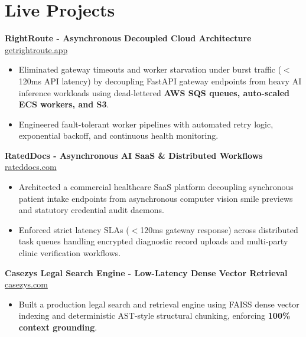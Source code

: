 \documentclass[9.5pt,a4paper]{article}
\begin{document}
\section*{Live Projects}
\noindent
\textbf{RightRoute - Asynchronous Decoupled Cloud Architecture} \hfill \href{https://getrightroute.app}{getrightroute.app}
\begin{itemize}
    \item Eliminated gateway timeouts and worker starvation under burst traffic ($<$120ms API latency) by decoupling FastAPI gateway endpoints from heavy AI inference workloads using dead-lettered \textbf{AWS SQS queues, auto-scaled ECS workers, and S3}.
    \item Engineered fault-tolerant worker pipelines with automated retry logic, exponential backoff, and continuous health monitoring.
\end{itemize}
\vspace{0.2pt}
\noindent
\textbf{RatedDocs - Asynchronous AI SaaS \& Distributed Workflows} \hfill \href{https://rateddocs.com}{rateddocs.com}
\begin{itemize}
    \item Architected a commercial healthcare SaaS platform decoupling synchronous patient intake endpoints from asynchronous computer vision smile previews and statutory credential audit daemons.
    \item Enforced strict latency SLAs ($<$120ms gateway response) across distributed task queues handling encrypted diagnostic record uploads and multi-party clinic verification workflows.
\end{itemize}
\vspace{0.2pt}
\noindent
\textbf{Casezys Legal Search Engine - Low-Latency Dense Vector Retrieval} \hfill \href{https://casezys.com}{casezys.com}
\begin{itemize}
    \item Built a production legal search and retrieval engine using FAISS dense vector indexing and deterministic AST-style structural chunking, enforcing \textbf{100\% context grounding}.
\end{itemize}
\vspace{0.2pt}
\end{document}
